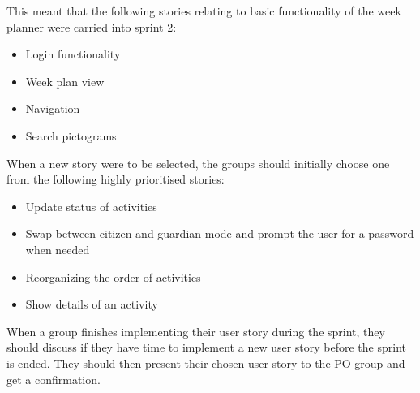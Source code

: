 This meant that the following stories relating to basic functionality of the week planner were carried into sprint 2:
\begin{itemize}
    \item Login functionality
    \item Week plan view
    \item Navigation
    \item Search pictograms
\end{itemize}
When a new story were to be selected, the groups should initially choose one from the following highly prioritised stories:
\begin{itemize}
    \item Update status of activities
    \item Swap between citizen and guardian mode and prompt the user for a password when needed
    \item Reorganizing the order of activities
    \item Show details of an activity
\end{itemize}
When a group finishes implementing their user story during the sprint, they should discuss if they have time to implement a new user story before the sprint is ended. They should then present their chosen user story to the PO group and get a confirmation.

